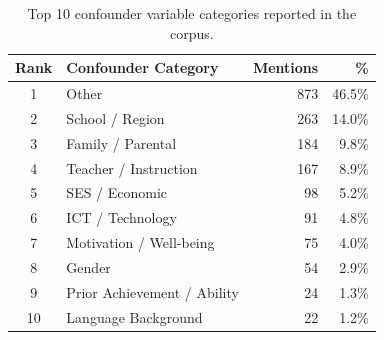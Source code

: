 \begin{table}[htbp]
  \centering
  \caption{Top 10 confounder variable categories reported in the corpus.}
  \label{tab:confounders}
  \begin{tabular}{clrr}
    \toprule
    Rank & Confounder Category & Mentions & \% \\
    \midrule
    1 & Other & 873 & 46.5\% \\
    2 & School / Region & 263 & 14.0\% \\
    3 & Family / Parental & 184 & 9.8\% \\
    4 & Teacher / Instruction & 167 & 8.9\% \\
    5 & SES / Economic & 98 & 5.2\% \\
    6 & ICT / Technology & 91 & 4.8\% \\
    7 & Motivation / Well-being & 75 & 4.0\% \\
    8 & Gender & 54 & 2.9\% \\
    9 & Prior Achievement / Ability & 24 & 1.3\% \\
    10 & Language Background & 22 & 1.2\% \\
    \bottomrule
  \end{tabular}
\end{table}